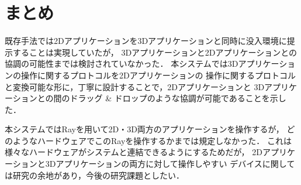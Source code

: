 
\section{まとめ}

既存手法では2Dアプリケーションを3Dアプリケーションと同時に没入環境に提示することは実現していたが，
3Dアプリケーションと2Dアプリケーションとの協調の可能性までは検討されていなかった．
本システムでは3Dアプリケーションの操作に関するプロトコルを2Dアプリケーションの
操作に関するプロトコルと変換可能な形に，丁寧に設計することで，2Dアプリケーションと
3Dアプリケーションとの間のドラッグ \& ドロップのような協調が可能であることを示した．

本システムではRayを用いて2D・3D両方のアプリケーションを操作するが，
どのようなハードウェアでこのRayを操作するかまでは規定しなかった．
これは様々なハードウェアがシステムと連結できるようにするためだが，
2Dアプリケーションと3Dアプリケーションの両方に対して操作しやすい
デバイスに関しては研究の余地があり，今後の研究課題としたい．
